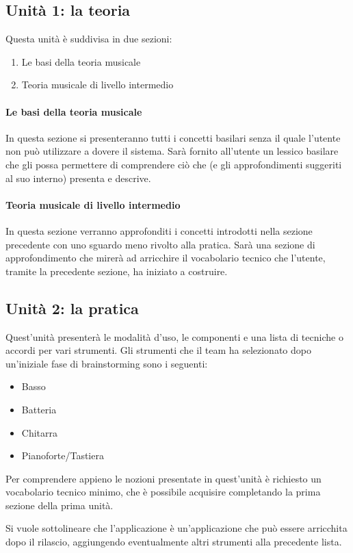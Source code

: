 \subsection{Unità 1: la teoria}
Questa unità è suddivisa in due sezioni:
\begin{enumerate}
	\item Le basi della teoria musicale
	\item Teoria musicale di livello intermedio
\end{enumerate}

\paragraph{Le basi della teoria musicale} In questa sezione si presenteranno tutti i concetti basilari senza il quale l'utente non può utilizzare a dovere il sistema. Sarà fornito all'utente un lessico basilare che gli possa permettere di comprendere ciò che \ProjectTitle{} (e gli approfondimenti suggeriti al suo interno) presenta e descrive.
\paragraph{Teoria musicale di livello intermedio} In questa sezione verranno approfonditi i concetti introdotti nella sezione precedente con uno sguardo meno rivolto alla pratica. Sarà una sezione di approfondimento che mirerà ad arricchire il vocabolario tecnico che l'utente, tramite la precedente sezione, ha iniziato a costruire.

\subsection{Unità 2: la pratica}
Quest'unità presenterà le modalità d'uso, le componenti e una lista di tecniche o accordi per vari strumenti. Gli strumenti che il team ha selezionato dopo un'iniziale fase di brainstorming sono i seguenti:
\begin{itemize}
	\item Basso
	\item Batteria
	\item Chitarra
	\item Pianoforte/Tastiera
\end{itemize}
Per comprendere appieno le nozioni presentate in quest'unità è richiesto un vocabolario tecnico minimo, che è possibile acquisire completando la prima sezione della prima unità.

Si vuole sottolineare che l'applicazione \ProjectTitle{} è un'applicazione che può essere arricchita dopo il rilascio, aggiungendo eventualmente altri strumenti alla precedente lista.

